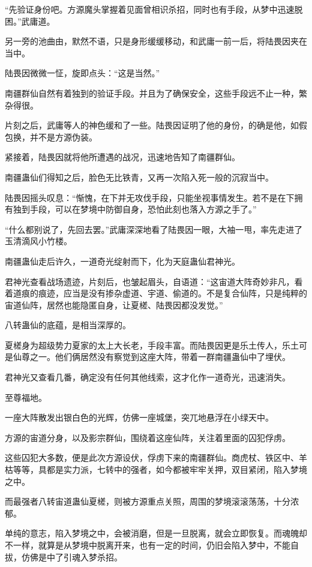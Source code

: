 \begin{this_body}
“先验证身份吧。方源魔头掌握着见面曾相识杀招，同时也有手段，从梦中迅速脱困。”武庸道。

另一旁的池曲由，默然不语，只是身形缓缓移动，和武庸一前一后，将陆畏因夹在当中。

陆畏因微微一怔，旋即点头：“这是当然。”

南疆群仙自然有着独到的验证手段。并且为了确保安全，这些手段远不止一种，繁杂得很。

片刻之后，武庸等人的神色缓和了一些。陆畏因证明了他的身份，的确是他，如假包换，并不是方源伪装。

紧接着，陆畏因就将他所遭遇的战况，迅速地告知了南疆群仙。

南疆蛊仙们得知之后，脸色无比铁青，又再一次陷入死一般的沉寂当中。

陆畏因摇头叹息：“惭愧，在下并无攻伐手段，只能坐视事情发生。若不是在下拥有独到手段，可以在梦境中防御自身，恐怕此刻也落入方源之手了。”

“什么都别说了，先回去罢。”武庸深深地看了陆畏因一眼，大袖一甩，率先走进了玉清滴风小竹楼。

南疆蛊仙走后许久，一道奇光绽射而下，化为天庭蛊仙君神光。

君神光查看战场遗迹，片刻后，也皱起眉头，自语道：“这宙道大阵奇妙非凡，看着道痕的痕迹，应当是没有掺杂虚道、宇道、偷道的。不是复合仙阵，只是纯粹的宙道仙阵，居然也能隐匿自身，让夏槎、陆畏因都没发觉。”

八转蛊仙的底蕴，是相当深厚的。

夏槎身为超级势力夏家的太上大长老，手段丰富。而陆畏因更是乐土传人，乐土可是仙尊之一。他们俩居然没有察觉到这座大阵，带着一群南疆蛊仙中了埋伏。

君神光又查看几番，确定没有任何其他线索，这才化作一道奇光，迅速消失。

至尊福地。

一座大阵散发出银白色的光辉，仿佛一座城堡，突兀地悬浮在小绿天中。

方源的宙道分身，以及影宗群仙，围绕着这座仙阵，关注着里面的囚犯俘虏。

这些囚犯大多数，便是此次方源设伏，俘虏下来的南疆群仙。商虎杖、铁区中、羊枯等等，具都是实力派，七转中的强者，如今都被牢牢关押，双目紧闭，陷入梦境之中。

而最强者八转宙道蛊仙夏槎，则被方源重点关照，周围的梦境滚滚荡荡，十分浓郁。

单纯的意志，陷入梦境之中，会被消磨，但是一旦脱离，就会立即恢复。而魂魄却不一样，就算是从梦境中脱离开来，也有一定的时间，仍旧会陷入梦中，不能自拔，仿佛是中了引魂入梦杀招。


\end{this_body}
